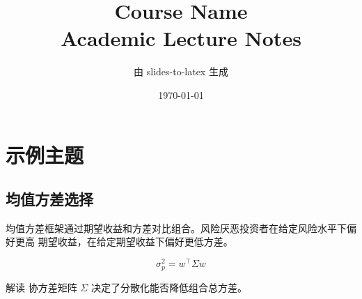 \documentclass[11pt, a4paper]{article}
\title{
  Course Name\\[0.3em]
  {\normalsize Academic Lecture Notes}
}
\author{由 slides-to-latex 生成}
\date{\today}
\begin{document}
\maketitle
\tableofcontents
\newpage

\section{示例主题}

\subsection*{均值方差选择}
均值方差框架通过期望收益和方差对比组合。风险厌恶投资者在给定风险水平下偏好更高
期望收益，在给定期望收益下偏好更低方差。

\begin{equation}
  \sigma_p^2 = w^\top \Sigma w
\end{equation}

\begin{conceptbox}{解读}
  协方差矩阵 $\Sigma$ 决定了分散化能否降低组合总方差。
\end{conceptbox}
\end{document}
